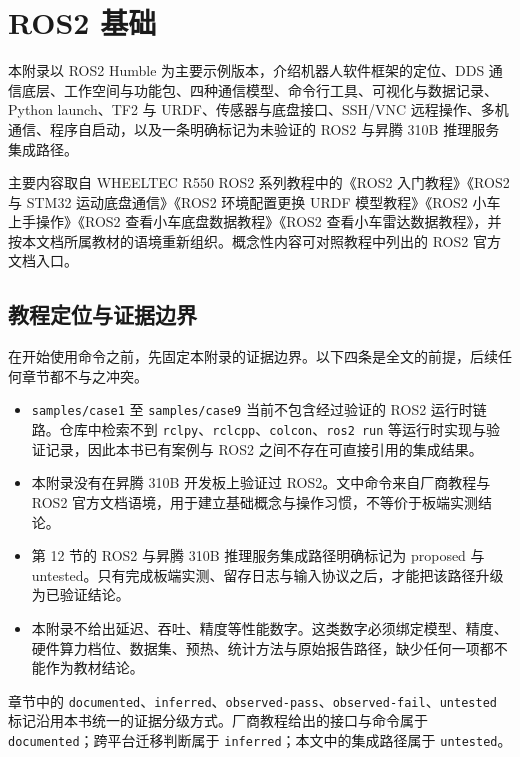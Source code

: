 \chapter{ROS2 基础}\label{ux9644ux5f55-5ros2-ux57faux7840}

本附录以 ROS2 Humble 为主要示例版本，介绍机器人软件框架的定位、DDS
通信底层、工作空间与功能包、四种通信模型、命令行工具、可视化与数据记录、Python
launch、TF2 与 URDF、传感器与底盘接口、SSH/VNC
远程操作、多机通信、程序自启动，以及一条明确标记为未验证的 ROS2 与昇腾
310B 推理服务集成路径。

主要内容取自 WHEELTEC R550 ROS2 系列教程中的《ROS2 入门教程》《ROS2 与
STM32 运动底盘通信》《ROS2 环境配置更换 URDF 模型教程》《ROS2
小车上手操作》《ROS2 查看小车底盘数据教程》《ROS2
查看小车雷达数据教程》，并按本文档所属教材的语境重新组织。概念性内容可对照教程中列出的
ROS2 官方文档入口。

\section{教程定位与证据边界}\label{src-appendix-appendix5-scope}

在开始使用命令之前，先固定本附录的证据边界。以下四条是全文的前提，后续任何章节都不与之冲突。

\begin{itemize}
\tightlist
\item
  \passthrough{\lstinline!samples/case1!} 至
  \passthrough{\lstinline!samples/case9!} 当前不包含经过验证的 ROS2
  运行时链路。仓库中检索不到
  \passthrough{\lstinline!rclpy!}、\passthrough{\lstinline!rclcpp!}、\passthrough{\lstinline!colcon!}、\passthrough{\lstinline!ros2 run!}
  等运行时实现与验证记录，因此本书已有案例与 ROS2
  之间不存在可直接引用的集成结果。
\item
  本附录没有在昇腾 310B 开发板上验证过 ROS2。文中命令来自厂商教程与 ROS2
  官方文档语境，用于建立基础概念与操作习惯，不等价于板端实测结论。
\item
  第 12 节的 ROS2 与昇腾 310B 推理服务集成路径明确标记为 proposed 与
  untested。只有完成板端实测、留存日志与输入协议之后，才能把该路径升级为已验证结论。
\item
  本附录不给出延迟、吞吐、精度等性能数字。这类数字必须绑定模型、精度、硬件算力档位、数据集、预热、统计方法与原始报告路径，缺少任何一项都不能作为教材结论。
\end{itemize}

章节中的
\passthrough{\lstinline!documented!}、\passthrough{\lstinline!inferred!}、\passthrough{\lstinline!observed-pass!}、\passthrough{\lstinline!observed-fail!}、\passthrough{\lstinline!untested!}
标记沿用本书统一的证据分级方式。厂商教程给出的接口与命令属于
\passthrough{\lstinline!documented!}；跨平台迁移判断属于
\passthrough{\lstinline!inferred!}；本文中的集成路径属于
\passthrough{\lstinline!untested!}。


